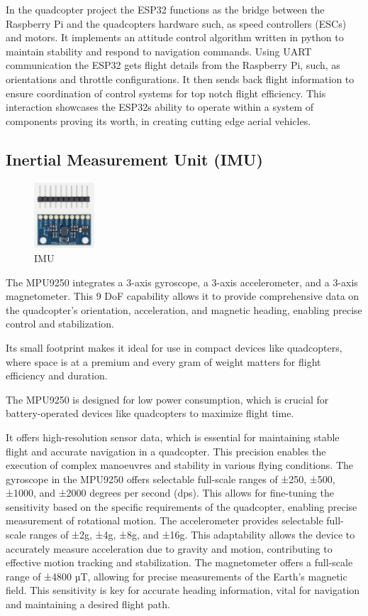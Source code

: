 \documentclass{article}
\begin{document}
In the quadcopter project the ESP32 functions as the bridge between the
Raspberry Pi and the quadcopters hardware such, as speed controllers (ESCs) and
motors. It implements an attitude control algorithm written in python to
maintain stability and respond to navigation commands. Using UART communication
the ESP32 gets flight details from the Raspberry Pi, such, as orientations and
throttle configurations. It then sends back flight information to ensure
coordination of control systems for top notch flight efficiency. This
interaction showcases the ESP32s ability to operate within a system of
components proving its worth, in creating cutting edge aerial vehicles.

\subsection{Inertial Measurement Unit (IMU)}\label{IMU}
\begin{figure}[H]
  \centering
  \includegraphics[width=0.2\textwidth]{Pictures/IMU.png}
  \caption{IMU}
  \label{fig:IMU}
\end{figure}
The MPU9250 integrates a 3-axis gyroscope, a 3-axis accelerometer, and a 3-axis
magnetometer. This 9 DoF capability allows it to provide comprehensive data on
the quadcopter's orientation, acceleration, and magnetic heading, enabling
precise control and stabilization.

Its small footprint makes it ideal for use in compact devices like quadcopters,
where space is at a premium and every gram of weight matters for flight
efficiency and duration.

The MPU9250 is designed for low power consumption, which is crucial for
battery-operated devices like quadcopters to maximize flight time.

It offers high-resolution sensor data, which is essential for maintaining stable
flight and accurate navigation in a quadcopter. This precision enables the
execution of complex manoeuvres and stability in various flying conditions. The
gyroscope in the MPU9250 offers selectable full-scale ranges of ±250, ±500,
±1000, and ±2000 degrees per second (dps). This allows for fine-tuning the
sensitivity based on the specific requirements of the quadcopter, enabling
precise measurement of rotational motion. The accelerometer provides selectable
full-scale ranges of ±2g, ±4g, ±8g, and ±16g. This adaptability allows the
device to accurately measure acceleration due to gravity and motion,
contributing to effective motion tracking and stabilization. The magnetometer
offers a full-scale range of ±4800 µT, allowing for precise measurements of the
Earth's magnetic field. This sensitivity is key for accurate heading
information, vital for navigation and maintaining a desired flight path.
\end{document}
